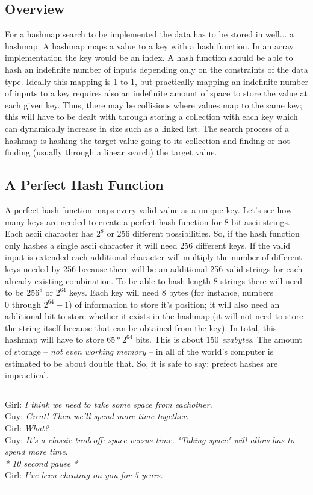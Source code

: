 \documentclass[letterpaper, 10pt]{article}
\begin{document}
\subsection{Overview}
For a hashmap search to be implemented the data has to be stored in well... a hashmap. A hashmap maps
a value to a key with a hash function. In an array implementation the key would be an index. A hash function
should be able to hash an indefinite number of inputs depending only on the constraints of the data type. 
Ideally this mapping is 1 to 1, but practically mapping an indefinite number of inputs to a key requires
also an indefinite amount of space to store the value at each given key. Thus, there may be collisions
where values map to the same key; this will have to be dealt with through storing a collection with each key
which can dynamically increase in size such as a linked list. The search process of a hashmap is
hashing the target value going to its collection and finding or not finding (usually through a linear search)
the target value.

\subsection{A Perfect Hash Function}
A perfect hash function maps every valid value as a unique key. Let's see how many keys
are needed to create a perfect hash function for 8 bit ascii strings. Each ascii character
has $2^8$ or 256 different possibilities. So, if the hash function only hashes
a single ascii character it will need 256 different keys. If the valid input is extended each
additional character will multiply the number of different keys needed by 256 because there will be an
additional 256 valid strings for each already existing combination. To be able to hash length 8
strings there will need to be $256^8$ or $2^{64}$ keys. Each key will need 8 bytes
(for instance, numbers\\ 0 through $2^{64}-1$) of information 
to store it's position; it will also need an additional bit to store whether it exists in
the hashmap (it will not need to store the string itself because that can be obtained from the key).
In total, this hashmap will have to store $65 * 2^{64}$ bits. This is about 150 \textit{exabytes}. The amount
of storage -- \textit{not even working memory} -- in all of the world's computer is estimated to be about double that. So, it is safe to say:
prefect hashes are impractical.
\vspace{.25cm}
\hrule
\vspace{.25cm}
\noindent
Girl: \textit{I think we need to take some space from eachother.}\\
Guy: \textit{Great! Then we'll spend more time together.}\\
Girl: \textit{What?}\\
Guy: \textit{It's a classic tradeoff: space versus time. "Taking space" will allow has to spend more time}.\\
\textit{* 10 second pause *}\\
Girl: \textit{I've been cheating on you for 5 years.}\\
\hrule
\vspace{1cm}
\end{document}
